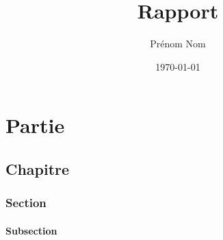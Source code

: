 \documentclass[a4paper,11pt]{report}
\title{Rapport}
\author{Prénom Nom}
\date{\today}
\begin{document}
\maketitle

\part{Partie}
\chapter{Chapitre}
\section{Section}
\subsection{Subsection}
\blindtext
\end{document}
